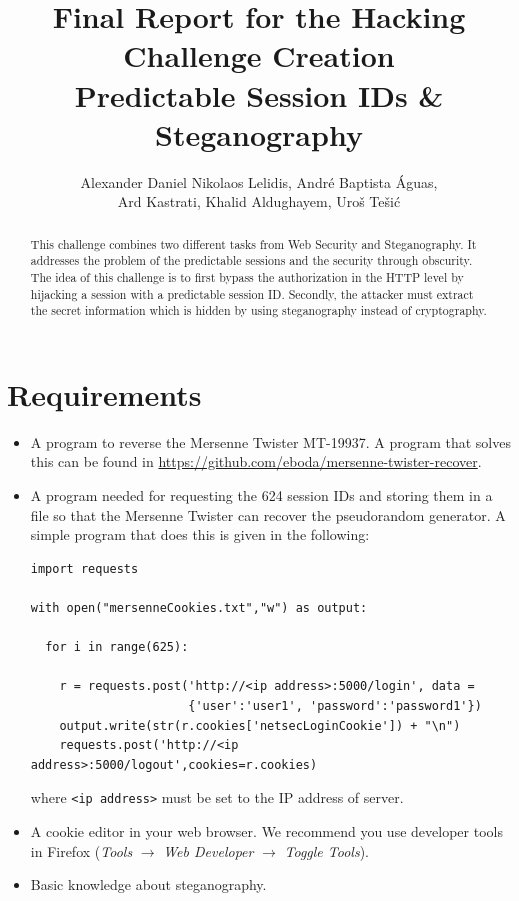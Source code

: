 \documentclass[11pt]{article}
\title{\vspace{-1.7cm}Final Report for the Hacking Challenge Creation
\\[0.3in]
\bfseries Predictable Session IDs \& Steganography
\\[0.1in]
}
\author{Alexander Daniel Nikolaos Lelidis, Andr\'{e} Baptista \'{A}guas, \\ Ard Kastrati, Khalid Aldughayem, Uro\v{s} Te\v{s}i\'{c}}
\begin{document}
\maketitle

\begin{abstract}
This challenge combines two different tasks from Web Security and Steganography. It addresses the problem of the predictable sessions and the security through obscurity. The idea of this challenge is to first bypass the authorization in the HTTP level by hijacking a session with a predictable session ID. Secondly, the attacker must extract the secret information which is hidden by using steganography instead of cryptography. 
\end{abstract}


\section{Requirements}

\begin{itemize}
\item A program to reverse the Mersenne Twister MT-19937. A program that solves this can be found in \url{https://github.com/eboda/mersenne-twister-recover}.
\item A program needed for requesting the 624 session IDs and storing them in a file so that the Mersenne Twister can recover the pseudorandom generator. A simple program that does this is given in the following:
\begin{verbatim}
import requests

with open("mersenneCookies.txt","w") as output:

  for i in range(625):
  
    r = requests.post('http://<ip address>:5000/login', data = 
                      {'user':'user1', 'password':'password1'})
    output.write(str(r.cookies['netsecLoginCookie']) + "\n")
    requests.post('http://<ip address>:5000/logout',cookies=r.cookies)
\end{verbatim}
where \texttt{<ip address>} must be set to the IP address of server. 
\item A cookie editor in your web browser. We recommend you use developer tools in Firefox (\textit{Tools} $\rightarrow$ \textit{Web Developer} $\rightarrow$ \textit{Toggle Tools}).
\item Basic knowledge about steganography.
\end{itemize}
\end{document}
